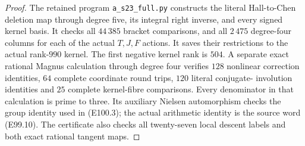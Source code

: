 \begin{proof}
The retained program
\texttt{a\_s23\_full.py} constructs the
literal Hall-to-Chen deletion map
through degree five, its integral
right inverse, and every signed
kernel basis. It checks all $44\,385$
bracket comparisons, and all $2\,475$
degree-four columns for each of the
actual $T,J,F$ actions. It saves
their restrictions to the actual
rank-$990$ kernel. The first negative
kernel rank is $504$.
A separate exact rational Magnus
calculation through degree four
verifies $128$ nonlinear correction
identities, $64$ complete coordinate
round trips, $120$ literal conjugate-
involution identities and $25$
complete kernel-fibre comparisons.
Every denominator in that calculation
is prime to three. Its auxiliary
Nielsen automorphism checks the
group identity used in (E100.3);
the actual arithmetic identity is
the source word (E99.10).
The certificate also checks all
twenty-seven local descent labels
and both exact rational tangent maps.
\end{proof}

